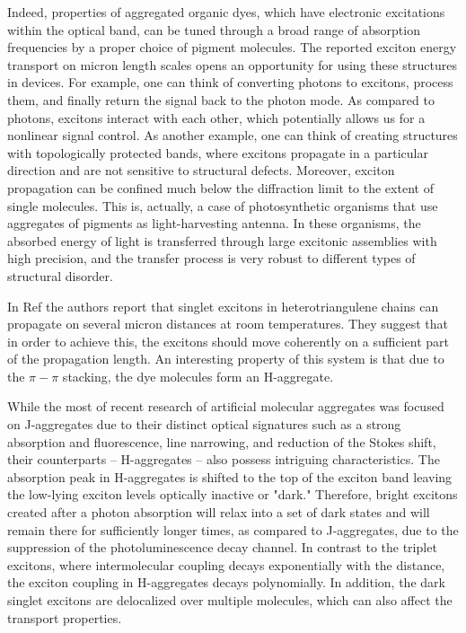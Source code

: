 \documentclass[journal=jacs,manuscript=article]{achemso}
\begin{document}
Indeed, properties of  aggregated organic dyes, which have electronic excitations within the optical band, can be tuned through a broad range of absorption frequencies by a proper choice of pigment molecules.\cite{Walker_NanoLett,Fabian201036} The reported exciton energy transport on micron length scales\cite{Yossi_PCCP2014,Haedler2015,Caram2016} opens an opportunity for using these structures in devices. For example, one can think of converting photons to excitons, process them, and finally return the signal back to the photon mode. As compared to photons, excitons interact with each other,\cite{Akselrod2010} which potentially allows us for a nonlinear signal control. As another example, one can think of creating structures with topologically protected bands, where excitons propagate in a particular direction and are not sensitive to structural defects.\cite{Yuen-Zhou2014, Joel_NatComm2016} Moreover, exciton propagation can be confined much below the diffraction limit to the extent of single molecules. This is, actually, a case of photosynthetic organisms that use aggregates of pigments as light-harvesting antenna.\cite{Scholes2011,Huh_JACS,Sawaya2015} In these organisms, the absorbed energy of light is transferred through large excitonic assemblies with high precision, and the transfer process is very robust to different types of structural disorder.

In Ref \cite{Haedler2015} the authors report that singlet excitons in heterotriangulene chains can propagate on several micron distances at room temperatures. They suggest that in order to achieve this, the excitons should move coherently on a sufficient part of the propagation length. An interesting property of this system is that due to the $\pi-\pi$ stacking, the dye molecules form an H-aggregate.

While the most of recent research of artificial molecular aggregates was focused on J-aggregates due to their distinct optical signatures such as a strong absorption and fluorescence, line narrowing, and reduction of the Stokes shift, their counterparts -- H-aggregates -- also possess intriguing characteristics. The absorption peak in H-aggregates is shifted to the top of the exciton band leaving the low-lying exciton levels optically inactive or "dark." Therefore, bright excitons created after a photon absorption will relax into a set of dark states and will remain there for sufficiently longer times, as compared to J-aggregates, due to the suppression of the photoluminescence decay channel. In contrast to the triplet excitons, where intermolecular coupling decays exponentially with the distance, the exciton coupling in H-aggregates decays polynomially. In addition, the dark singlet excitons are delocalized over multiple molecules,\cite{David_ACSEnLett2016} which can also affect the transport properties.
\end{document}
